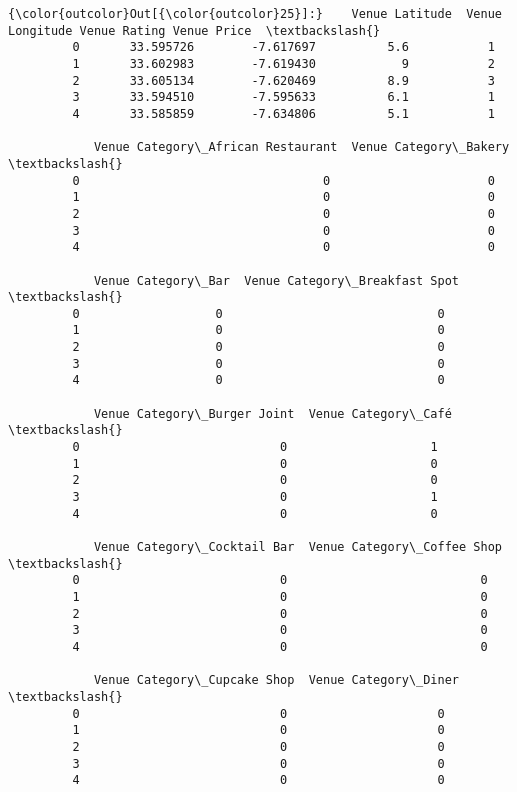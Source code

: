 \documentclass[11pt]{article}
\begin{document}
\begin{Verbatim}[commandchars=\\\{\}]
{\color{outcolor}Out[{\color{outcolor}25}]:}    Venue Latitude  Venue Longitude Venue Rating Venue Price  \textbackslash{}
         0       33.595726        -7.617697          5.6           1   
         1       33.602983        -7.619430            9           2   
         2       33.605134        -7.620469          8.9           3   
         3       33.594510        -7.595633          6.1           1   
         4       33.585859        -7.634806          5.1           1   
         
            Venue Category\_African Restaurant  Venue Category\_Bakery  \textbackslash{}
         0                                  0                      0   
         1                                  0                      0   
         2                                  0                      0   
         3                                  0                      0   
         4                                  0                      0   
         
            Venue Category\_Bar  Venue Category\_Breakfast Spot  \textbackslash{}
         0                   0                              0   
         1                   0                              0   
         2                   0                              0   
         3                   0                              0   
         4                   0                              0   
         
            Venue Category\_Burger Joint  Venue Category\_Café  \textbackslash{}
         0                            0                    1   
         1                            0                    0   
         2                            0                    0   
         3                            0                    1   
         4                            0                    0   
         
            Venue Category\_Cocktail Bar  Venue Category\_Coffee Shop  \textbackslash{}
         0                            0                           0   
         1                            0                           0   
         2                            0                           0   
         3                            0                           0   
         4                            0                           0   
         
            Venue Category\_Cupcake Shop  Venue Category\_Diner  \textbackslash{}
         0                            0                     0   
         1                            0                     0   
         2                            0                     0   
         3                            0                     0   
         4                            0                     0   
         

\end{Verbatim}
\end{document}
